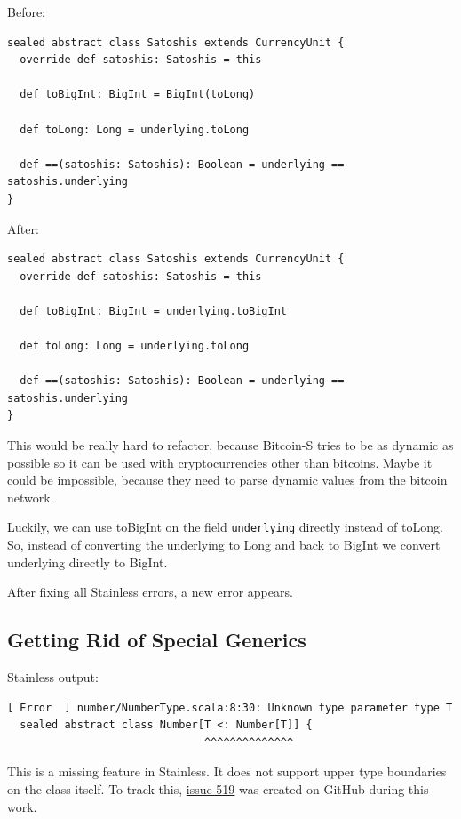 \documentclass[runningheads]{llncs}
\begin{document}
Before:
\begin{lstlisting}[style=scala]
sealed abstract class Satoshis extends CurrencyUnit {
  override def satoshis: Satoshis = this

  def toBigInt: BigInt = BigInt(toLong)

  def toLong: Long = underlying.toLong

  def ==(satoshis: Satoshis): Boolean = underlying == satoshis.underlying
}
\end{lstlisting}

After:
\begin{lstlisting}[style=scala]
sealed abstract class Satoshis extends CurrencyUnit {
  override def satoshis: Satoshis = this

  def toBigInt: BigInt = underlying.toBigInt

  def toLong: Long = underlying.toLong

  def ==(satoshis: Satoshis): Boolean = underlying == satoshis.underlying
}
\end{lstlisting}

This would be really hard to refactor, because Bitcoin-S tries to be as dynamic as possible so it can be used with cryptocurrencies other than bitcoins.
Maybe it could be impossible, because they need to parse dynamic values from the bitcoin network.

Luckily, we can use toBigInt on the field \texttt{underlying} directly instead of toLong.
So, instead of converting the underlying to Long and back to BigInt we convert underlying directly to BigInt.

After fixing all Stainless errors, a new error appears.


\subsection{Getting Rid of Special Generics}

Stainless output:
\begin{lstlisting}[style=stainless]
  [ Error  ] number/NumberType.scala:8:30: Unknown type parameter type T
  sealed abstract class Number[T <: Number[T]] {
                               ^^^^^^^^^^^^^^

\end{lstlisting}

This is a missing feature in Stainless.
It does not support upper type boundaries on the class itself.
To track this, \href{https://github.com/epfl-lara/stainless/issues/519}{issue 519} was created on GitHub during this work.
\end{document}
